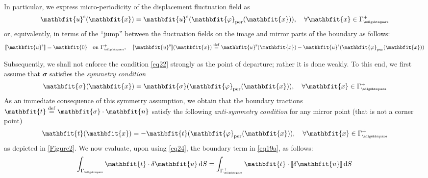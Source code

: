 \documentclass[12pt,a4paper]{article}
\renewcommand{\ta}[1]{\mathbfit{#1}}
\renewcommand{\ts}[1]{\mathbfit{#1}}
\renewcommand{\Box}{\mdlgwhtsquare}
\DeclarePairedDelimiter{\jmp}{[\![}{]\!]}
\newcommand{\per}{\mathrm{per}}
\newcommand{\rve}{
  {\mathchoice
   {\mbox{\scalebox{0.67}{$\Box$}}}
   {\mbox{\scalebox{0.67}{$\Box$}}}
   {\mbox{\scalebox{0.5}{$\Box$}}}
   {\mbox{\scalebox{0.375}{$\Box$}}}
  }
}
\begin{document}
In particular, we express micro-periodicity of the displacement fluctuation field as
\begin{equation}
    \ta{u}^\fluct(\ta{x}) = \ta{u}^\fluct(\ta{\varphi}_\per(\ta{x})), \quad
    \forall \ta{x}\in\Gamma_\rve^+
\label{eq21}
\end{equation}
or, equivalently, in terms of the ``jump'' between the fluctuation fields on the image and mirror parts of the boundary as follows:
\begin{equation}
    \jmp{\ta{u}^\fluct} = \ta{0} \quad \makebox{on } \Gamma_\rve^+, \quad
    \jmp{\ta{u}^\fluct}(\ta{x}) \defeq \ta{u}^\fluct(\ta{x})-\ta{u}^\fluct(\ta{\varphi}_\per(\ta{x}))
\label{eq22}
\end{equation}

Subsequently, we shall not enforce the condition \cref{eq22} strongly as the point of departure; rather it is done weakly.
To this end, we first assume that $\ts{\sigma}$ satisfies the \emph{symmetry condition}
\begin{equation}
    \ts{\sigma}(\ta{x}) = \ts{\sigma}(\ta{\varphi}_\per(\ta{x})), \quad
    \forall \ta{x}\in\Gamma_\rve^+
\label{eq23}
\end{equation}
As an immediate consequence of this symmetry assumption, we obtain that the boundary tractions $\ta{t}\defeq\ts{\sigma}\cdot\ta{n}$ satisfy the following \emph{anti-symmetry condition} for any mirror point (that is not a corner point)
\begin{equation}
    \ta{t}(\ta{x}) = -\ta{t}(\ta{\varphi}_\per(\ta{x})), \quad
    \forall \ta{x}\in\Gamma_\rve^+
\label{eq24}
\end{equation}
as depicted in \cref{Figure2}.
We now evaluate, upon using \cref{eq24}, the boundary term in
\cref{eq19a}, as follows:
\begin{equation}
    \int_{\Gamma_\rve} \ta{t} \cdot \delta \ta{u} \dif S =
    \int_{\Gamma_\rve^+} \ta{t} \cdot \jmp{\delta \ta{u}} \dif S
\label{eq25}
\end{equation}
\end{document}
